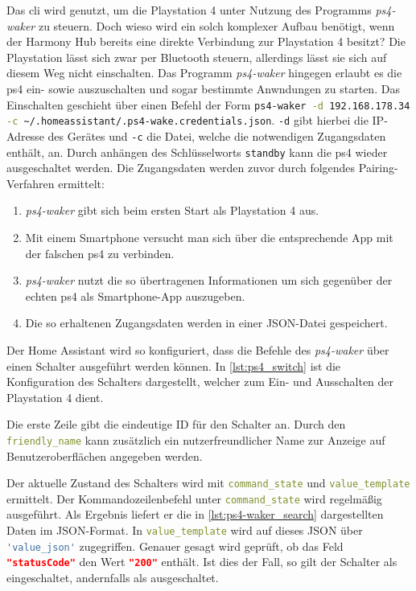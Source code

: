 Das \ac{cli} wird genutzt, um die Playstation 4 unter Nutzung des Programms \textit{ps4-waker}\cite{dhleongp12:online} zu steuern.
Doch wieso wird ein solch komplexer Aufbau benötigt, wenn der Harmony Hub bereits eine direkte Verbindung zur Playstation 4 besitzt?
Die Playstation lässt sich zwar per Bluetooth steuern, allerdings lässt sie sich auf diesem Weg nicht einschalten.
Das Programm \textit{ps4-waker} hingegen erlaubt es die \ac{ps4} ein- sowie auszuschalten und sogar bestimmte Anwndungen zu starten.
Das Einschalten geschieht über einen Befehl der Form \lstinline[language=bash]{ps4-waker -d 192.168.178.34  -c ~/.homeassistant/.ps4-wake.credentials.json}.
\lstinline[language=bash]{-d} gibt hierbei die IP-Adresse des Gerätes und
\lstinline[language=bash]{-c} die Datei,
welche die notwendigen Zugangsdaten enthält, an.
Durch anhängen des Schlüsselworts \lstinline[language=bash]{standby} kann die
\ac{ps4} wieder ausgeschaltet werden.
Die Zugangsdaten werden zuvor durch folgendes Pairing-Verfahren ermittelt:
\begin{enumerate}
    \setlength\itemsep{-0.5em}
    \item \textit{ps4-waker} gibt sich beim ersten Start als Playstation 4 aus.
    \item Mit einem Smartphone versucht man sich über die entsprechende App mit der falschen \ac{ps4} zu verbinden.
    \item \textit{ps4-waker} nutzt die so übertragenen Informationen um sich gegenüber der echten \ac{ps4} als Smartphone-App auszugeben.
    \item Die so erhaltenen Zugangsdaten werden in einer JSON-Datei gespeichert.
\end{enumerate}


Der Home Assistant wird so konfiguriert,
dass die Befehle des \textit{ps4-waker} über einen Schalter ausgeführt werden können.
In \autoref{lst:ps4_switch} ist die Konfiguration des Schalters dargestellt,
welcher zum Ein- und Ausschalten der Playstation 4 dient.



Die erste Zeile gibt die eindeutige ID für den Schalter an.
Durch den \lstinline[language=yaml]{friendly_name} kann zusätzlich ein nutzerfreundlicher Name zur Anzeige auf Benutzeroberflächen angegeben werden.

Der aktuelle Zustand des Schalters wird mit \lstinline[language=yaml]{command_state} und
\lstinline[language=yaml]{value_template} ermittelt.
Der Kommandozeilenbefehl unter \lstinline[language=yaml]{command_state} wird regelmäßig ausgeführt.
Als Ergebnis liefert er die in \autoref{lst:ps4-waker_search} dargestellten Daten im JSON-Format.
In \lstinline[language=yaml]{value_template} wird auf dieses JSON über
\lstinline[language=yaml]{'value_json'} zugegriffen.
Genauer gesagt wird geprüft,
ob das Feld \lstinline[language=json]{"statusCode"} den Wert
\lstinline[language=json]{"200"} enthält.
Ist dies der Fall, so gilt der Schalter als eingeschaltet, andernfalls als ausgeschaltet.

